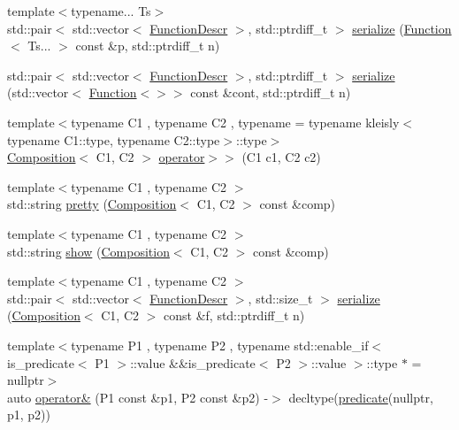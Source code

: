 \begin{DoxyCompactItemize}
\item 
{\footnotesize template$<$typename... Ts$>$ }\\std\+::pair$<$ std\+::vector$<$ \hyperlink{structpfq_1_1lang_1_1FunctionDescr}{Function\+Descr} $>$, std\+::ptrdiff\+\_\+t $>$ \hyperlink{namespacepfq_1_1lang_a91564354df60bcd58020fbe47e1a7b2a}{serialize} (\hyperlink{structpfq_1_1lang_1_1Function}{Function}$<$ Ts... $>$ const \&p, std\+::ptrdiff\+\_\+t n)
\item 
std\+::pair$<$ std\+::vector$<$ \hyperlink{structpfq_1_1lang_1_1FunctionDescr}{Function\+Descr} $>$, std\+::ptrdiff\+\_\+t $>$ \hyperlink{namespacepfq_1_1lang_aa88658cb028dffc2e03a0fe2e8304bec}{serialize} (std\+::vector$<$ \hyperlink{structpfq_1_1lang_1_1Function}{Function}$<$$>$$>$ const \&cont, std\+::ptrdiff\+\_\+t n)
\item 
{\footnotesize template$<$typename C1 , typename C2 , typename  = typename kleisly$<$typename C1\+::type, typename C2\+::type$>$\+::type$>$ }\\\hyperlink{structpfq_1_1lang_1_1Composition}{Composition}$<$ C1, C2 $>$ \hyperlink{namespacepfq_1_1lang_aa5c4ec63004bfee1742b763ca4a53b23}{operator$>$$>$} (C1 c1, C2 c2)
\item 
{\footnotesize template$<$typename C1 , typename C2 $>$ }\\std\+::string \hyperlink{namespacepfq_1_1lang_a5340947126ab493f4d30d5fe36193978}{pretty} (\hyperlink{structpfq_1_1lang_1_1Composition}{Composition}$<$ C1, C2 $>$ const \&comp)
\item 
{\footnotesize template$<$typename C1 , typename C2 $>$ }\\std\+::string \hyperlink{namespacepfq_1_1lang_a073037bfa3d5b01e3b25af56cd504df3}{show} (\hyperlink{structpfq_1_1lang_1_1Composition}{Composition}$<$ C1, C2 $>$ const \&comp)
\item 
{\footnotesize template$<$typename C1 , typename C2 $>$ }\\std\+::pair$<$ std\+::vector$<$ \hyperlink{structpfq_1_1lang_1_1FunctionDescr}{Function\+Descr} $>$, std\+::size\+\_\+t $>$ \hyperlink{namespacepfq_1_1lang_a10060155d79b978287b3a4c1460ba494}{serialize} (\hyperlink{structpfq_1_1lang_1_1Composition}{Composition}$<$ C1, C2 $>$ const \&f, std\+::ptrdiff\+\_\+t n)
\item 
{\footnotesize template$<$typename P1 , typename P2 , typename std\+::enable\+\_\+if$<$ is\+\_\+predicate$<$ P1 $>$\+::value \&\&is\+\_\+predicate$<$ P2 $>$\+::value $>$\+::type $\ast$  = nullptr$>$ }\\auto \hyperlink{namespacepfq_1_1lang_af24d9c3092f064b0732a4b601dde2c64}{operator\&} (P1 const \&p1, P2 const \&p2) -\/$>$ decltype(\hyperlink{namespacepfq_1_1lang_aca9adafc436b7f851621b979fa1aaf88}{predicate}(nullptr, p1, p2))

\end{DoxyCompactItemize}
